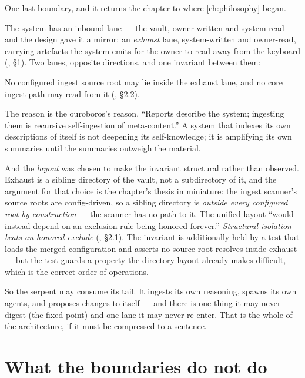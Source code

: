 One last boundary, and it returns the chapter to where \autoref{ch:philosophy}
began.

The system has an inbound lane --- the vault, owner-written and system-read --- and
the design gave it a mirror: an \emph{exhaust} lane, system-written and owner-read,
carrying artefacts the system emits for the owner to read away from the keyboard
(, \S 1). Two lanes, opposite directions, and one
invariant between them:

\begin{invariant}
\label{inv:exhaust}
No configured ingest source root may lie inside the exhaust lane, and no core
ingest path may read from it (, \S 2.2).
\end{invariant}

The reason is the ouroboros's reason. ``Reports describe the system; ingesting them
is recursive self-ingestion of meta-content.'' A system that indexes its own
descriptions of itself is not deepening its self-knowledge; it is amplifying its
own summaries until the summaries outweigh the material.

And the \emph{layout} was chosen to make the invariant structural rather than
observed. Exhaust is a sibling directory of the vault, not a subdirectory of it,
and the argument for that choice is the chapter's thesis in miniature: the ingest
scanner's source roots are config-driven, so a sibling directory is \emph{outside
every configured root by construction} --- the scanner has no path to it. The
unified layout ``would instead depend on an exclusion rule being honored forever.''
\emph{Structural isolation beats an honored exclude}
(, \S 2.1). The invariant is additionally held by a test
that loads the merged configuration and asserts no source root resolves inside
exhaust --- but the test guards a property the directory layout already makes
difficult, which is the correct order of operations.

So the serpent may consume its tail. It ingests its own reasoning, spawns its own
agents, and proposes changes to itself --- and there is one thing it may never
digest (the fixed point) and one lane it may never re-enter. That is the whole of
the architecture, if it must be compressed to a sentence.

\section{What the boundaries do not do}
\label{sec:residuals}

